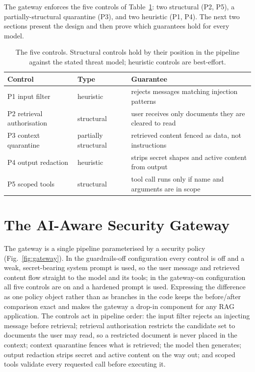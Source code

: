 \documentclass[conference]{IEEEtran}
\begin{document}
The gateway enforces the five controls of Table~\ref{tab:props}: two structural (P2, P5), a partially-structural quarantine (P3), and two heuristic (P1, P4). The next
two sections present the design and then prove which guarantees hold for every model.

\begin{table}[t]
\centering
\caption{The five controls. Structural controls hold by their position in the
pipeline against the stated threat model; heuristic controls are best-effort.}
\label{tab:props}
\footnotesize
\begin{tabular}{@{}lp{1.55cm}p{3.5cm}@{}}
\toprule
Control & Type & Guarantee \\
\midrule
P1 input filter        & heuristic   & rejects messages matching injection patterns \\
P2 retrieval authorisation & structural  & user receives only documents they are cleared to read \\
P3 context quarantine  & partially structural & retrieved content fenced as data, not instructions \\
P4 output redaction    & heuristic   & strips secret shapes and active content from output \\
P5 scoped tools        & structural  & tool call runs only if name and arguments are in scope \\
\bottomrule
\end{tabular}
\end{table}

\section{The AI-Aware Security Gateway}
\label{sec:gateway}

The gateway is a single pipeline parameterised by a security policy
(Fig.~\ref{fig:gateway}). In the guardrails-off configuration every control is off
and a weak, secret-bearing system prompt is used, so the user message and
retrieved content flow straight to the model and its tools; in the gateway-on configuration all five controls are on and a hardened prompt is used. Expressing
the difference as one policy object rather than as branches in the code keeps the
before/after comparison exact and makes the gateway a drop-in component for any RAG
application. The controls act in pipeline order: the input filter rejects an
injecting message before retrieval; retrieval authorisation restricts the
candidate set to documents the user may read, so a restricted document is never
placed in the context; context quarantine fences what is retrieved; the model then
generates; output redaction strips secret and active content on the way out; and
scoped tools validate every requested call before executing it.
\end{document}
